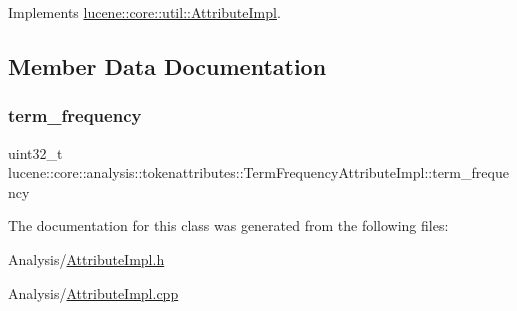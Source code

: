 Implements \mbox{\hyperlink{classlucene_1_1core_1_1util_1_1AttributeImpl_a010e8937832f53139c8fe42757476895}{lucene\+::core\+::util\+::\+Attribute\+Impl}}.



\subsection{Member Data Documentation}
\mbox{\label{classlucene_1_1core_1_1analysis_1_1tokenattributes_1_1TermFrequencyAttributeImpl_a94d743632e8edd5e9e05ce039eec16e8}} 
\subsubsection{\texorpdfstring{term\+\_\+frequency}{term\_frequency}}
{\footnotesize\ttfamily uint32\+\_\+t lucene\+::core\+::analysis\+::tokenattributes\+::\+Term\+Frequency\+Attribute\+Impl\+::term\+\_\+frequency\hspace{0.3cm}{\ttfamily [private]}}



The documentation for this class was generated from the following files\+:\begin{DoxyCompactItemize}
\item 
Analysis/\mbox{\hyperlink{AttributeImpl_8h}{Attribute\+Impl.\+h}}\item 
Analysis/\mbox{\hyperlink{AttributeImpl_8cpp}{Attribute\+Impl.\+cpp}}\end{DoxyCompactItemize}
